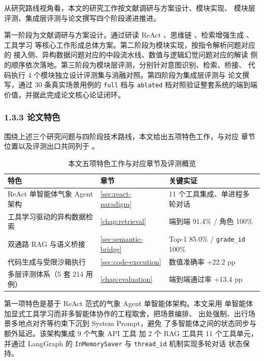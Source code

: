 从研究路线视角看，本文的研究工作按文献调研与方案设计、模块实现、
模块层评测、集成层评测与论文撰写四个阶段递进推进。

第一阶段为文献调研与方案设计。通过研读 ReAct \cite{ref18}、思维链
\cite{ref13}、检索增强生成 \cite{ref12}、工具学习 \cite{ref21, ref28}
等核心工作形成总体方案。第二阶段为模块实现，按指令解析问题对应的
接入侧、异构数据问题对应的中段流水线、数值与逻辑幻觉问题对应的解读
侧的顺序依次落地。第三阶段为模块层评测，分别针对意图识别、检索、桥接、
代码执行 4 个模块独立设计评测集与消融对照。第四阶段为集成层评测与
论文撰写，通过 30 条真实场景用例的 \texttt{full} 档与 \texttt{ablated}
档对照验证整套系统的端到端价值，并据此完成论文核心论证闭环。

\subsubsection*{1.3.3 \quad 论文特色}

围绕上述三个研究问题与四阶段技术路线，本文给出五项特色工作，与对应
章节位置以及评测出口共同列于 。

\begin{table}[!ht]
    \centering
    \caption{本文五项特色工作与对应章节及评测概览}
    \label{tab:contributions}
    \song\fontsize{9pt}{12pt}\selectfont
    \renewcommand{\arraystretch}{0.95}
    \begin{tabular}{lll}
        \toprule
        特色 & 章节 & 关键实证 \\
        \midrule
        ReAct 单智能体气象 Agent 架构 & \ref{sec:react-paradigm} & 11 个工具集成、单进程多轮对话 \\
        工具学习驱动的异构数据检索 & \ref{chap:retrieval} & 端到端 91.4\% / 角色 100\% \\
        双通路 RAG 与语义桥接 & \ref{sec:semantic-bridge} & Top-1 85.0\% / \texttt{grade\_\bk{}id} 100\% \\
        代码生成与受限沙箱执行 & \ref{sec:code-execution} & 数值准确率 +22.2 pp \\
        多层评测体系（5 套 214 用例） & \ref{chap:evaluation} & 端到端通过率 +13.4 pp \\
        \bottomrule
    \end{tabular}
\end{table}

第一项特色是基于 ReAct 范式的气象 Agent 单智能体架构。本文采用
单智能体加显式工具学习而非多智能体协作的工程取舍，把场景编排、
出处强制、出行场景多地点对齐等约束下沉到 System Prompt，避免
了多智能体之间的状态同步与额外延迟。该架构集成 9 个气象 API 工具
加 2 个 RAG 工具共 11 个工具单元，并通过 LangGraph 的
\texttt{InMemorySaver} 与 \texttt{thread\_\bk{}id} 机制实现多轮对话
状态保持。


